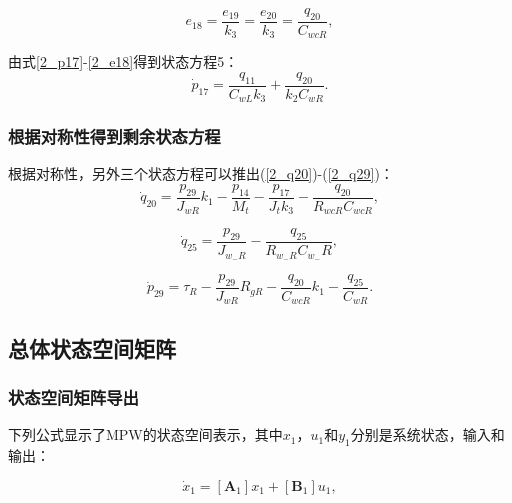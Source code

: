 \begin{equation}\label{2_e18}
e_{18}
=
\frac{e_{19}}{k_3}
=
\frac{e_{20}}{k_3}
=
\frac{q_{20}}{C_{wc R}},
\end{equation}

由式\ref{2_p17}-\ref{2_e18}得到状态方程5：
\begin{equation}
\dot{p}_{17}
=
\frac{q_{11}}{C_{w L} k_{3}}
+
\frac{q_{20}}{k_{2} C_{w R}}.
\end{equation}

\subsubsection{根据对称性得到剩余状态方程}
根据对称性，另外三个状态方程可以推出(\ref{2_q20})-(\ref{2_q29})：
\begin{equation}\label{2_q20}
\dot{q}_{20}
=
\frac{p_{29}}{J_{w R}} k_{1}
-
\frac{p_{14}}{M_{t}}
-
\frac{p_{17}}{J_{t} k_{3}}
-
\frac{q_{20}}{R_{wc R} C_{wc R} },
\end{equation}

\begin{equation}\label{2_q25}
\dot{q}_{25}=\frac{p_{29}}{J_{w_{-} R}}-\frac{q_{25}}{R_{w_{-} R} C_{w_{-}} R},
\end{equation}

\begin{equation}\label{2_q29}
\dot{p}_{29}
=
\tau_{R}-\frac{p_{29}}{J_{w R}} R_{g R}
-
\frac{q_{20}}{C_{wc R}} k_{1}
-
\frac{q_{25}}{C_{w R}}.
\end{equation}

\subsection{总体状态空间矩阵}

\subsubsection{状态空间矩阵导出}

下列公式显示了MPW的状态空间表示，其中$ x_1$，$u_1$和$y_1$分别是系统状态，输入和输出：

\begin{equation}\label{2_dot_x1}
\dot{x}_1 =[\mathbf{A}_1] x_1+[\mathbf{B}_1] u_1,
\end{equation}

